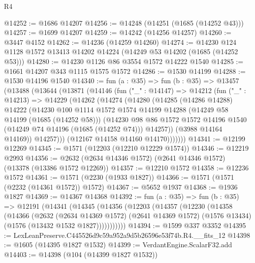 \begin{lexlean}{R4}
\begin{coremodule}
@14252 := @1686 @14207
@14256 := @14248 (@14251 (@1685 (@14252 @43)))
@14257 := @1699 @14207
@14259 := @14242 (@14256 @14257)
@14260 := @3447 @4152
@14262 := @14236 (@14259 @14260)
@14274 := @14230 @124 @1128 @1572 @13413 @14202 @14224 (@14249 @53 @14202 (@1685 (@14252 @53)))
@14280 := @14230 @1126 @86 @3554 @1572 @14222 @1540
@14285 := @1661 @14207 @343 @1115 @1575 @1572
@14286 := @1530 @14199
@14288 := @1530 @14196 @1540
@14340 := fun (a : @35) =>
  fun (b : @35) =>
  @13457
    (@13488
      (@13644
        (@13871
          (@14146
            (fun ("_" : @14147) =>
            @14212
              (fun ("_" : @14213) =>
              @14229
                (@14262
                  (@14274
                    (@14280
                      (@14285
                        (@14286 @14288)
                        @14222
                        (@14230
                          @100
                          @1114
                          @1572
                          @1574
                          @14199
                          @14288
                          (@14249 @58 @14199 (@1685 (@14252 @58)))
                          (@14230
                            @98
                            @86
                            @1572
                            @1572
                            @14196
                            @1540
                            (@14249 @74 @14196 (@1685 (@14252 @74)))
                            @14257))
                        (@3988 @14164 @14169))
                      @14257)))
                (@12167 @14158 @14160 @14170)))))))
@14341 := @12199 @12269
@14345 := @1571 (@12203 (@12210 @12229 @1574))
@14346 := @12219 @2993
@14356 := @2632 (@2634 @14346 @1572) (@2641 @14346 @1572) (@13378 (@13386 @1572 @12269))
@14357 := @12210 @1572
@14358 := @12236 @1572
@14361 := @1571 (@2230 (@1933 @1827))
@14366 := @1571 (@1571 (@2232 (@14361 @1572)) @1572)
@14367 := @5652 @1937
@14368 := @1936 @1827
@14369 := @14367 @14368
@14392 := fun (a : @35) =>
  fun (b : @35) =>
  @12191
    (@14341
      (@14345
        (@14356
          (@12203
            (@14357
              (@12230
                (@14358
                  (@14366
                    (@2632
                      (@2634 @14369 @1572)
                      (@2641 @14369 @1572)
                      (@1576 @13434)
                      (@1576 (@13432 @1532 @1827)))))))))))
@14394 := @1599 @337 @3352
@14395 := LexLeanPreserve.C445526d9c59a952a9d5b26596e53f74b.R4.__fits_12
@14398 := @1605 (@14395 @1827 @1532)
@14399 := VerdantEngine.ScalarF32.add
@14403 := @14398 (@104 (@14399 @1827 @1532))

\end{coremodule}
\end{lexlean}
